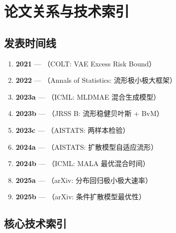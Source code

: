 \section{论文关系与技术索引}\label{sec:synthesis}

\subsection{发表时间线}\label{sec:timeline}

\begin{enumerate}
    \item \textbf{2021} --- \citep{tang2021vae}（COLT: VAE Excess Risk Bound）
    \item \textbf{2022} --- \citep{tang2022minimax}
          （Annals of Statistics: 流形极小极大框架）
    \item \textbf{2023a} --- \citep{tang2023lowdim}
          （ICML: MLDMAE 混合生成模型）
    \item \textbf{2023b} --- \citep{tang2023robust}
          （JRSS B: 流形稳健贝叶斯 + BvM）
    \item \textbf{2023c} --- \citep{tang2023twosample}
          （AISTATS: 两样本检验）
    \item \textbf{2024a} --- \citep{tang2024diffusion}
          （AISTATS: 扩散模型自适应流形）
    \item \textbf{2024b} --- \citep{tang2024mala}
          （ICML: MALA 最优混合时间）
    \item \textbf{2025a} --- \citep{tang2025regression}
          （arXiv: 分布回归极小极大速率）
    \item \textbf{2025b} --- \citep{tang2025conditional}
          （arXiv: 条件扩散模型最优性）
\end{enumerate}

\subsection{核心技术索引}\label{sec:tech-index}

